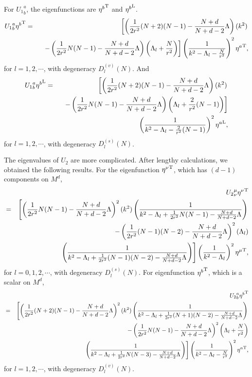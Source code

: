 \documentclass[a4paper,aps,preprint,groupedaddress,showpacs]{revtex4}
\begin{document}
For ${U_{1}}^{a}_{b}$, the eigenfunctions are ${\eta^{b}}^{\rm T}$
and ${\eta^{b}}^{\rm L}$.
\begin{eqnarray}
{U_{1}}^{a}_{b}{\eta^{b}}^{\rm T}&=&
\left[\left(\frac{1}{2r^{2}}(N+2)(N-1)-
\frac{N+d}{N+d-2}\Lambda\right)(k^{2})\right.
\nonumber\\
&&\ \ \left.
-\left(\frac{1}{2r^{2}}N(N-1)-
\frac{N+d}{N+d-2}\Lambda\right)
\left(\Lambda_{l}+\frac{N}{r^{2}}\right)\right]
\left(\frac{1}{k^{2}-\Lambda_{l}-\frac{N}{r^{2}}}\right)^{2}
{\eta^{a}}^{\rm T},
\end{eqnarray}
for $l=1,2,\cdots$, with degeneracy $D^{(v)}_{l}(N)$. And
\begin{eqnarray}
{U_{1}}^{a}_{b}{\eta^{b}}^{\rm L}&=&
\left[\left(\frac{1}{2r^{2}}(N+2)(N-1)-
\frac{N+d}{N+d-2}\Lambda\right)(k^{2})\right.
\nonumber\\
&&\ \ \left.
-\left(\frac{1}{2r^{2}}N(N-1)-
\frac{N+d}{N+d-2}\Lambda\right)
\left(\Lambda_{l}+\frac{2}{r^{2}}(N-1)\right)\right]
\nonumber\\
&&\ \ \ \ 
\left(\frac{1}{k^{2}-\Lambda_{l}-\frac{2}{r^{2}}(N-1)}\right)^{2}
{\eta^{a}}^{\rm L},
\end{eqnarray}
for $l=1,2,\cdots$, with degeneracy $D^{(s)}_{l}(N)$.        

The eigenvalues of $U_{2}$ are more complicated. After lengthy
calculations, we obtained the following results. For the eigenfunction
${\eta^{\nu}}^{\rm T}$, which has $(d-1)$ components on $M^{d}$,
\begin{eqnarray}
&&{U_{2}}^{\mu}_{\nu}{\eta^{\nu}}^{\rm T}
\nonumber\\
&=&
\left[\left(\frac{1}{2r^{2}}N(N-1)-
\frac{N+d}{N+d-2}\Lambda\right)^{2}(k^{2})
\left(\frac{1}{k^{2}-\Lambda_{l}+\frac{1}{2r^{2}}N(N-1)-
\frac{N+d}{N+d-2}\Lambda}\right)
\right.\nonumber\\
&&\ \ -\left(\frac{1}{2r^{2}}(N-1)(N-2)-
\frac{N+d}{N+d-2}\Lambda\right)^{2}(\Lambda_{l})
\nonumber\\
&&\ \ \ \ \left.
\left(\frac{1}{k^{2}-\Lambda_{l}+\frac{1}{2r^{2}}(N-1)(N-2)-
\frac{N+d}{N+d-2}\Lambda}\right)\right]
\left(\frac{1}{k^{2}-\Lambda_{l}}\right)^{2}{\eta^{\mu}}^{\rm T},
\end{eqnarray}
for $l=0,1,2,\cdots$, with degeneracy $D^{(s)}_{l}(N)$. 
For eigenfunction ${\eta^{b}}^{\rm T}$, which is a scalar on
$M^{d}$,
\begin{eqnarray}
&&{U_{2}}^{a}_{b}{\eta^{b}}^{\rm T}
\nonumber\\
&=&
\left[\left(\frac{1}{2r^{2}}(N+2)(N-1)-
\frac{N+d}{N+d-2}\Lambda\right)^{2}(k^{2})
\left(\frac{1}{k^{2}-\Lambda_{l}+\frac{1}{2r^{2}}(N+1)(N-2)-
\frac{N+d}{N+d-2}\Lambda}\right)
\right.\nonumber\\
&&\ \ -\left(\frac{1}{2r^{2}}N(N-1)-
\frac{N+d}{N+d-2}\Lambda\right)^{2}
\left(\Lambda_{l}+\frac{N}{r^{2}}\right)
\nonumber\\
&&\ \ \ \ \left.
\left(\frac{1}{k^{2}-\Lambda_{l}+\frac{1}{2r^{2}}N(N-3)-
\frac{N+d}{N+d-2}\Lambda}\right)\right]
\left(\frac{1}{k^{2}-\Lambda_{l}-\frac{N}{r^{2}}}\right)^{2}
{\eta^{a}}^{\rm T},
\end{eqnarray}
for $l=1,2,\cdots$, with degeneracy $D^{(v)}_{l}(N)$.        
\end{document}
